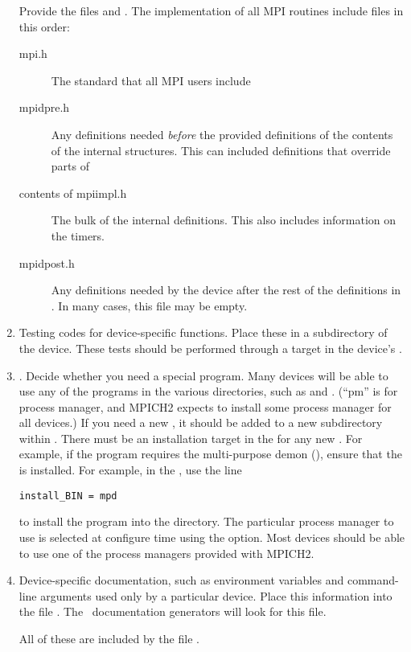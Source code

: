 \begin{enumerate}
Provide the files
 and .  The implementation of all MPI
routines include files in this order:

\begin{description}
\item[mpi.h]The standard  that all MPI users include
\item[mpidpre.h]Any definitions needed \emph{before} the provided
definitions of the contents of the internal structures.  This can
included definitions that override parts of 
\item[contents of mpiimpl.h]The bulk of the internal definitions.
This also includes information on the timers.
\item[mpidpost.h]Any definitions needed by the device after the rest
of the definitions in .  In many cases, this file may
be empty.
\end{description}

\item Testing codes for device-specific functions.  Place these
in a  subdirectory of the device. These tests 
should be performed through a  target in the device's
. 


\item {}.  Decide whether you need a special
   program.  Many devices will be able to use any of the
 programs in the various  directories, such
as  and .  (``pm'' is for process
manager, and MPICH2 expects to install some process manager for all
devices.)
If you need a new
, it should be added to a new subdirectory within
.  There must be an installation target in the
 for any new .  For example, if the
 program requires the multi-purpose demon
  (), ensure that the  is installed.  For example,
  in the , use the line
\begin{verbatim}
install_BIN = mpd
\end{verbatim}
to install the program  into the  directory.  The
particular process manager to use is selected at configure time using
the  option.  Most devices should be able to use one
of the process managers provided with MPICH2.

\item Device-specific documentation, such as environment variables and
  command-line arguments used only by a particular device.  Place this
  information into the file .
  The \mpich\ 
  documentation generators will look for this file.


All of these are included by the file .
\end{enumerate}

